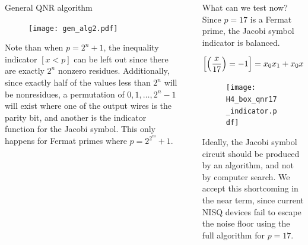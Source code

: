 \documentclass[final]{beamer}
\newlength{\sepwidth}
\newlength{\colwidth}
\newcommand{\separatorcolumn}{\begin{column}{\sepwidth}\end{column}}
\begin{document}
\begin{frame}[t]
\begin{columns}[t]
\begin{column}{\colwidth}
  \begin{block}{General QNR algorithm}

    \begin{center}
    \begin{figure}
      \texttt{[image: gen\_alg2.pdf]}
    \end{figure}
    \end{center}

    Note than when $p=2^n+1$, the inequality indicator $[x<p]$ can be left out since there are exactly $2^n$ nonzero residues.
    Additionally, since exactly half of the values less than $2^n$ will be nonresidues, a permutation of $0,1,\ldots ,2^{n}-1$ will exist where one of the output wires is the parity bit, and another is the indicator function for the Jacobi symbol.
  This only happens for Fermat primes where $p=2^{2^m}+1$.
  \end{block}


\end{column}

\separatorcolumn

\begin{column}{\colwidth}

  \begin{block}{What can we test now?}
    Since $p=17$ is a Fermat prime, the Jacobi symbol indicator is balanced.

 $$\left[\left( \displaystyle\frac{x}{17} \right)=-1\right]=x_0x_1+x_0x_2+x_1x_2+x_1x_3+x_2x_3+x_0x_1x_3$$

 \begin{center}
    \begin{figure}
      \texttt{[image: H4\_box\_qnr17\_indicator.pdf]}
    \end{figure}
 \end{center}

    Ideally, the Jacobi symbol circuit should be produced by an algorithm, and not by computer search.
    We accept this shortcoming in the near term, since current NISQ devices fail to escape the noise floor using the full algorithm for $p=17$.


\end{block}
\end{column}
\end{columns}
\end{frame}
\end{document}
